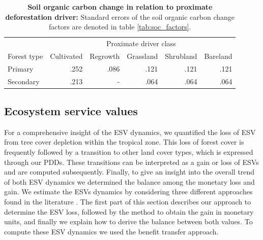 		\begin{table}[ht]
			\centering
			\caption[Soil organic carbon change in relation to proximate deforestation driver]{\textbf{Soil organic carbon change in relation to proximate deforestation driver:} Standard errors of the soil organic carbon change factors are denoted in table \ref{tab:soc_factors}.}
			\label{tab:scenario}
			\begin{tabular}{lrrrrr}
				\hline
				& \multicolumn{5}{c}{Proximate driver class} \\\cline{2-6}
				Forest type & Cultivated & Regrowth & Grassland & Shrubland & Bareland \\
				\hline
				Primary & .252 & .086 & .121 & .121 & .121 \\
				Secondary & .213 & - & .064 & .064 & .064 \\
				\hline
			\end{tabular}
		\end{table}

	\subsection{Ecosystem service values}
	\label{subsec:methods_esv}
		For a comprehensive insight of the \ac{ESV} dynamics, we quantified the loss of \ac{ESV} from tree cover depletion within the tropical zone. This loss of forest cover is frequently followed by a transition to other land cover types, which is expressed through our \acp{PDD}. These transitions can be interpreted as a gain or loss of \acp{ESV} and are computed subsequently. Finally, to give an insight into the overall trend of both \ac{ESV} dynamics we determined the balance among the monetary loss and gain. We estimate the \acp{ESV} dynamics by considering three different approaches found in the literature \citep{Costanza2014,Groot2012,Siikamaki2015}. The first part of this section describes our approach to determine the \ac{ESV} loss, followed by the method to obtain the gain in monetary units, and finally we explain how to derive the balance between both values. To compute these \ac{ESV} dynamics we used the benefit transfer approach.

